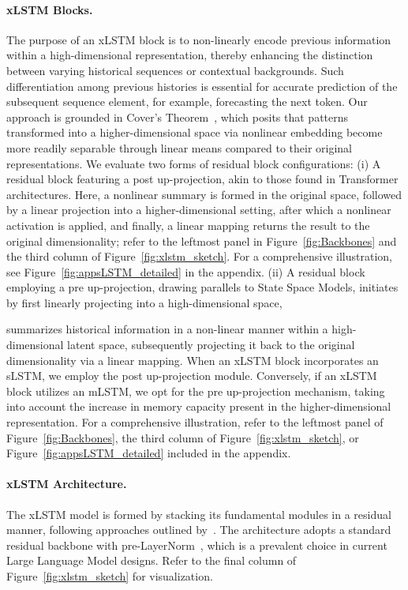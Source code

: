 \paragraph{xLSTM Blocks.}
\label{sec:xLSTMblock}
The purpose of an xLSTM block is to non-linearly encode previous information within a high-dimensional representation, thereby enhancing the distinction between varying historical sequences or contextual backgrounds. Such differentiation among previous histories is essential for accurate prediction of the subsequent sequence element, for example, forecasting the next token. Our approach is grounded in Cover’s Theorem~\citep{Cover:65}, which posits that patterns transformed into a higher-dimensional space via nonlinear embedding become more readily separable through linear means compared to their original representations. We evaluate two forms of residual block configurations: (i) A residual block featuring a post up-projection, akin to those found in Transformer architectures. Here, a nonlinear summary is formed in the original space, followed by a linear projection into a higher-dimensional setting, after which a nonlinear activation is applied, and finally, a linear mapping returns the result to the original dimensionality; refer to the leftmost panel in Figure~\ref{fig:Backbones} and the third column of Figure~\ref{fig:xlstm_sketch}. For a comprehensive illustration, see Figure~\ref{fig:appsLSTM_detailed} in the appendix. (ii) A residual block employing a pre up-projection, drawing parallels to State Space Models, initiates by first linearly projecting into a high-dimensional space,

summarizes historical information in a non-linear manner within a high-dimensional latent space, subsequently projecting it back to the original dimensionality via a linear mapping. When an xLSTM block incorporates an sLSTM, we employ the post up-projection module. Conversely, if an xLSTM block utilizes an mLSTM, we opt for the pre up-projection mechanism, taking into account the increase in memory capacity present in the higher-dimensional representation. For a comprehensive illustration, refer to the leftmost panel of Figure~\ref{fig:Backbones}, the third column of Figure~\ref{fig:xlstm_sketch}, or Figure~\ref{fig:appsLSTM_detailed} included in the appendix.

\paragraph{xLSTM Architecture. }
\label{sec:xLSTMarchitecure}
The xLSTM model is formed by stacking its fundamental modules in a residual manner, following approaches outlined by~\citet{Srivastava:15,He:16}. The architecture adopts a standard residual backbone with pre-LayerNorm~\citep{Ba:16b}, which is a prevalent choice in current Large Language Model designs. Refer to the final column of Figure~\ref{fig:xlstm_sketch} for visualization.

